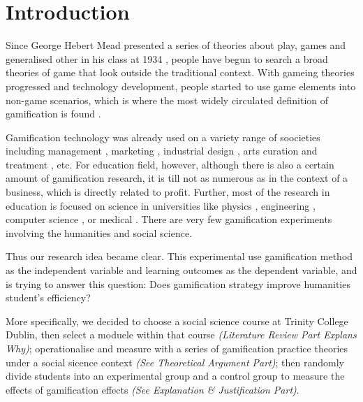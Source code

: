\documentclass[12pt]{article} %
\begin{document}
\section*{Introduction}

\vspace{.5cm}

\noindent Since George Hebert Mead presented a series of theories about play, games and generalised other in his class at 1934 \citep{Mead34}, people have begun to search a broad theories of game that look outside the traditional context. With gameing theories progressed and technology development, people started to use game elements into non-game scenarios, which is where the most widely circulated definition of gamification is found \citep{deterding2011game, richards2014beyond, marczewski2013gamification}.
\par
\noindent Gamification technology was already used on a variety range of soocieties including management \citep{deterding2019gamification}, marketing \citep{huotari2012defining}, industrial design \citep{reis2020prospects}, arts curation and treatment \citep{dias2018gamification, pramana2018using}, etc. For education field, however, although there is also a certain amount of gamification research, it is till not as numerous as in the context of a business, which is directly related to profit. Further, most of the research in education is focused on science in universities like physics \citep{rose2016gamification}, engineering \citep{barata2013engaging}, computer science \citep{ibanez2014gamification}, or medical \citep{nevin2014gamification}. There are very few gamification experiments involving the humanities and social science.
\par
\noindent Thus our research idea became clear. This experimental use gamification method as the independent variable and learning outcomes as the dependent variable, and is trying to answer this question: Does gamification strategy improve humanities student's efficiency?
\par
\noindent More specifically, we decided to choose a social science course at Trinity College Dublin, then select a moduele within that course \textit{(Literature Review Part Explans Why)}; operationalise and measure with a series of gamification practice theories under a social sicence context \textit{(See Theoretical Argument Part)}; then randomly divide students into an experimental group and a control group to measure the effects of gamification effects \textit{(See Explanation \& Justification Part)}.
\end{document}

